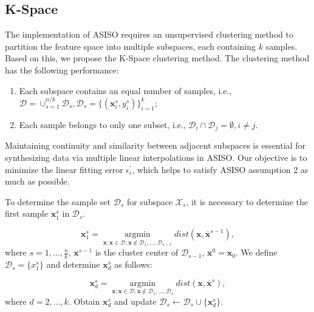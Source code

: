 \documentclass[sn-mathphys,Numbered]{sn-jnl}%
\theoremstyle{thmstyleone}%
\theoremstyle{thmstyletwo}%
\theoremstyle{thmstylethree}%
\begin{document}
\subsection{K-Space}\label{subsec2}

The implementation of ASISO requires an unsupervised clustering method to partition the feature space into multiple subspaces, each containing $k$ samples. Based on this, we propose the K-Space clustering method. The clustering method has the following performance:

\begin{enumerate}[1.]

\item Each subspace contains an equal number of samples, i.e., $\mathcal{D}=\cup_{s=1}^{n/k}\mathcal{D}_s,\mathcal{D}_s=\{(\boldsymbol{x}_i^s,y_i^s)\}_{{i=1}}^k$;

\item Each sample belongs to only one subset, i.e., $\mathcal{D}_i\cap\mathcal{D}_j=\emptyset,i\neq j$.

\end{enumerate}

Maintaining continuity and similarity between adjacent subspaces is essential for synthesizing data via multiple linear interpolations in ASISO. Our objective is to minimize the linear fitting error $\epsilon_i^\prime$, which helps to satisfy ASISO assumption 2 as much as possible.

To determine the sample set $\mathcal{D}_s$ for subspace $\mathcal{X}_s$, it is necessary to determine the first sample $\boldsymbol{x}_1^s$ in $\mathcal{D}_s$.

\begin{equation}
\boldsymbol{x}_1^s=\mathop{argmin}\limits_{\boldsymbol{x}:\boldsymbol{x}\in\mathcal{D},\boldsymbol{x}\notin\mathcal{D}_1,\ldots,\mathcal{D}_{s-1}}dist(\boldsymbol{x},\overline{\boldsymbol{x}}^{s-1}), \label{eq9}
\end{equation}
where $s=1,\ldots,\frac{n}{k}$, $\overline{\boldsymbol{x}}^{s-1}$ is the cluster center of $\mathcal{D}_{{s-1}}$, $\overline{\boldsymbol{x}}^0=\boldsymbol{x}_0$. We define $\mathcal{D}_s=\{x_1^s\}$ and determine $\boldsymbol{x}_d^s$ as follows:

\begin{equation}
\boldsymbol{x}_d^s=\mathop{argmin}\limits_{\boldsymbol{x}:\boldsymbol{x}\in\mathcal{D},\boldsymbol{x}\notin\mathcal{D}_1,\ldots,\mathcal{D}_{s}}dist(\boldsymbol{x},\overline{\boldsymbol{x}}^{s}),\label{eq10}
\end{equation}
where $d=2,\ldots,k$. Obtain $\boldsymbol{x}_d^s$ and update $\mathcal{D}_s\leftarrow\mathcal{D}_s\cup\{\boldsymbol{x}_d^s\}$.
\end{document}
